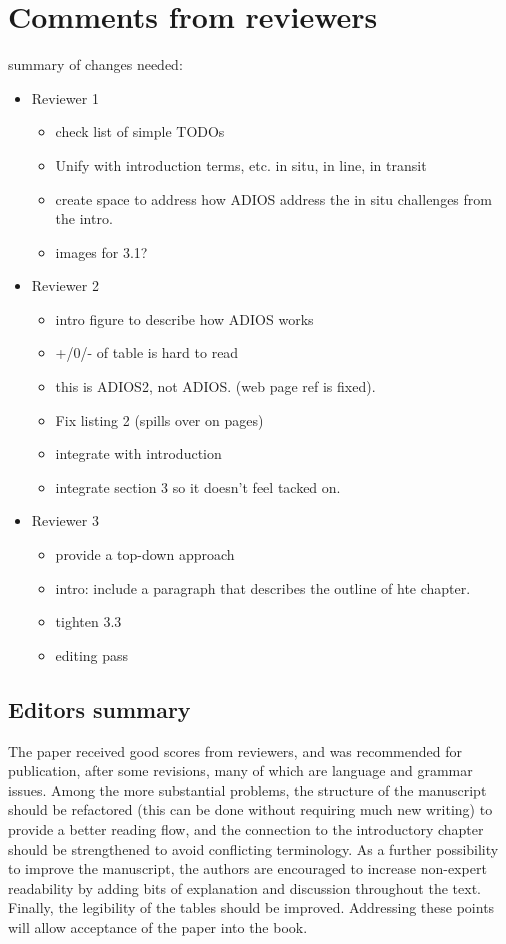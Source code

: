 \section{Comments from reviewers}

summary of changes needed:
\begin{itemize}
    \item Reviewer 1
    \begin{itemize}
        \item check list of simple TODOs
        \item Unify with introduction terms, etc. in situ, in line, in transit
        \item create space to address how ADIOS address the in situ challenges from the intro.
        \item images for 3.1?
    \end{itemize}
 \item Reviewer 2
    \begin{itemize}
        \item intro figure to describe how ADIOS works
        \item +/0/- of table is hard to read
        \item this is ADIOS2, not ADIOS. (web page ref is fixed).
        \item Fix listing 2 (spills over on pages)
        \item integrate with introduction
        \item integrate section 3 so it doesn't feel tacked on.
    \end{itemize}   
    
\item Reviewer 3
    \begin{itemize}
        \item provide a top-down approach
        \item intro: include a paragraph that describes the outline of hte chapter.
        \item tighten 3.3
        \item editing pass
    \end{itemize}    
    
\end{itemize}

\subsection{Editors summary}
The paper received good scores from reviewers, and was recommended for publication, after some revisions, many of which are language and grammar issues. Among the more substantial problems, the structure of the manuscript should be refactored (this can be done without requiring much new writing) to provide a better reading flow, and the connection to the introductory chapter should be strengthened to avoid conflicting terminology. As a further possibility to improve the manuscript, the authors are encouraged to increase non-expert readability by adding bits of explanation and discussion throughout the text. Finally, the legibility of the tables should be improved. Addressing these points will allow acceptance of the paper into the book.


